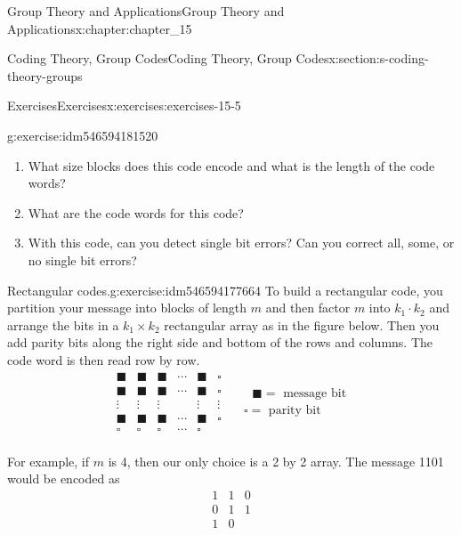 \documentclass[oneside,10pt,]{book}
\numberwithin{equation}{section}
\begin{document}
\begin{chapterptx}{Group Theory and Applications}{}{Group Theory and Applications}{}{}{x:chapter:chapter_15}
\begin{sectionptx}{Coding Theory, Group Codes}{}{Coding Theory, Group Codes}{}{}{x:section:s-coding-theory-groups}
\begin{exercises-subsection}{Exercises}{}{Exercises}{}{}{x:exercises:exercises-15-5}
\begin{divisionexercise}{5}{}{}{g:exercise:idm546594181520}
%
\par
%
\begin{enumerate}[label=(\alph*)]
\item{}What size blocks does this code encode and what is the length of the code words?%
\item{}What are the code words for this code?%
\item{}With this code, can you detect single bit errors?  Can you correct all, some, or no single bit errors?%
\end{enumerate}
%
\end{divisionexercise}%
\begin{divisionexercise}{6}{Rectangular codes.}{}{g:exercise:idm546594177664}%
To build a rectangular code, you partition your message into blocks of length \(m\) and then factor \(m\) into \(k_1\cdot k_2\)  and arrange the bits in a  \(k_1 \times k_2\) rectangular array as in the figure below.  Then you add parity bits along the right side and bottom of the rows and columns.   The code word is then read row by row.%
\begin{equation*}
\begin{array}{cccccc}
\blacksquare  & \blacksquare  & \blacksquare  & \cdots  & \blacksquare  & \square  \\
\blacksquare  & \blacksquare  & \blacksquare  & \cdots  & \blacksquare  & \square  \\
\vdots  & \vdots  & \vdots  &   & \vdots  & \vdots  \\
\blacksquare  & \blacksquare  & \blacksquare  & \cdots  & \blacksquare  & \square  \\
\square  & \square  & \square  & \cdots  & \square  &   \\
\end{array}  \quad \begin{array}{c}
\textrm{      }\blacksquare  = \textrm{ message} \textrm{ bit} \\
\square  =\textrm{ parity} \textrm{ bit} \\
\end{array}
\end{equation*}
%
\par
For example, if \(m\) is 4, then our only choice is a 2 by 2 array.  The message 1101 would be encoded as%
\begin{equation*}
\begin{array}{cc|c}
1 & 1 & 0\\
0 & 1 & 1\\
\hline
1 & 0 &\\

\end{array}
\end{equation*}
\end{divisionexercise}
\end{exercises-subsection}
\end{sectionptx}
\end{chapterptx}
\end{document}
